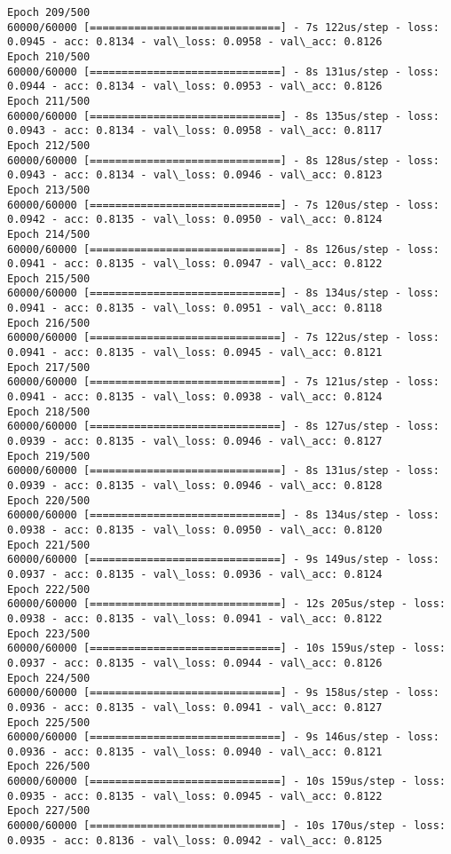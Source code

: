 \documentclass[11pt]{article}
\begin{document}
\begin{Verbatim}[commandchars=\\\{\}]
Epoch 209/500
60000/60000 [==============================] - 7s 122us/step - loss: 0.0945 - acc: 0.8134 - val\_loss: 0.0958 - val\_acc: 0.8126
Epoch 210/500
60000/60000 [==============================] - 8s 131us/step - loss: 0.0944 - acc: 0.8134 - val\_loss: 0.0953 - val\_acc: 0.8126
Epoch 211/500
60000/60000 [==============================] - 8s 135us/step - loss: 0.0943 - acc: 0.8134 - val\_loss: 0.0958 - val\_acc: 0.8117
Epoch 212/500
60000/60000 [==============================] - 8s 128us/step - loss: 0.0943 - acc: 0.8134 - val\_loss: 0.0946 - val\_acc: 0.8123
Epoch 213/500
60000/60000 [==============================] - 7s 120us/step - loss: 0.0942 - acc: 0.8135 - val\_loss: 0.0950 - val\_acc: 0.8124
Epoch 214/500
60000/60000 [==============================] - 8s 126us/step - loss: 0.0941 - acc: 0.8135 - val\_loss: 0.0947 - val\_acc: 0.8122
Epoch 215/500
60000/60000 [==============================] - 8s 134us/step - loss: 0.0941 - acc: 0.8135 - val\_loss: 0.0951 - val\_acc: 0.8118
Epoch 216/500
60000/60000 [==============================] - 7s 122us/step - loss: 0.0941 - acc: 0.8135 - val\_loss: 0.0945 - val\_acc: 0.8121
Epoch 217/500
60000/60000 [==============================] - 7s 121us/step - loss: 0.0941 - acc: 0.8135 - val\_loss: 0.0938 - val\_acc: 0.8124
Epoch 218/500
60000/60000 [==============================] - 8s 127us/step - loss: 0.0939 - acc: 0.8135 - val\_loss: 0.0946 - val\_acc: 0.8127
Epoch 219/500
60000/60000 [==============================] - 8s 131us/step - loss: 0.0939 - acc: 0.8135 - val\_loss: 0.0946 - val\_acc: 0.8128
Epoch 220/500
60000/60000 [==============================] - 8s 134us/step - loss: 0.0938 - acc: 0.8135 - val\_loss: 0.0950 - val\_acc: 0.8120
Epoch 221/500
60000/60000 [==============================] - 9s 149us/step - loss: 0.0937 - acc: 0.8135 - val\_loss: 0.0936 - val\_acc: 0.8124
Epoch 222/500
60000/60000 [==============================] - 12s 205us/step - loss: 0.0938 - acc: 0.8135 - val\_loss: 0.0941 - val\_acc: 0.8122
Epoch 223/500
60000/60000 [==============================] - 10s 159us/step - loss: 0.0937 - acc: 0.8135 - val\_loss: 0.0944 - val\_acc: 0.8126
Epoch 224/500
60000/60000 [==============================] - 9s 158us/step - loss: 0.0936 - acc: 0.8135 - val\_loss: 0.0941 - val\_acc: 0.8127
Epoch 225/500
60000/60000 [==============================] - 9s 146us/step - loss: 0.0936 - acc: 0.8135 - val\_loss: 0.0940 - val\_acc: 0.8121
Epoch 226/500
60000/60000 [==============================] - 10s 159us/step - loss: 0.0935 - acc: 0.8135 - val\_loss: 0.0945 - val\_acc: 0.8122
Epoch 227/500
60000/60000 [==============================] - 10s 170us/step - loss: 0.0935 - acc: 0.8136 - val\_loss: 0.0942 - val\_acc: 0.8125

\end{Verbatim}
\end{document}
